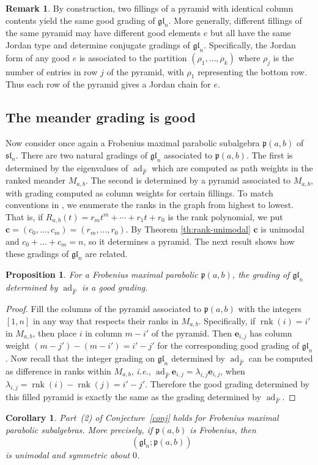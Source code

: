 \documentclass{amsart}
\def\bc{\mathbf{c}}
\def\be{\mathbf{e}}
\def\fp{\mathfrak p} %
\def\sl{\mathfrak{sl}}
\def\gl{\mathfrak{gl}}
\def\hatF{\widehat{F}}
\newcommand{\pab}[1][a,b]{\fp(#1)}
\def\sln{\sl_n}
\def\gln{\gl_n}
\newcommand{\Rfull}[1]{R_{#1}}
\def\dimvec{\mathop{\underline{\mathrm{dim}}}}
\def\ad{\operatorname{ad}}
\def\rnk{\operatorname{rnk}}
\newtheorem{corollary}[theorem]{Corollary}
\newtheorem{proposition}[theorem]{Proposition}
\theoremstyle{definition}
\newtheorem{remark}[theorem]{Remark}
\begin{document}
\begin{remark}\label{rem:identical-or-conjugate} 
By construction, two fillings of a pyramid with identical column contents yield the same good grading of $\gln$. More generally, different fillings of the same pyramid may have different good elements $e$ but all have the same Jordan type and determine conjugate gradings of $\gln$. Specifically, the Jordan form of any good $e$ is associated to the partition $(\rho_1, \ldots, \rho_k)$ where $\rho_j$ is the number of entries in row $j$ of the pyramid, with $\rho_1$ representing the bottom row. Thus each row of the pyramid gives a Jordan chain for $e$. 
\end{remark}

\subsection{The meander grading is good}
Now consider once again a Frobenius maximal parabolic subalgebra $\pab$ of $\sln$. There are two natural gradings of $\gln$ associated to $\pab$. The first is determined by the eigenvalues of $\ad_{\hatF}$ which are computed as path weights in the ranked meander $M_{a,b}$. The second is determined by a pyramid associated to $M_{a,b}$, with grading computed as column weights for certain fillings. To match conventions in \cite{elashvili2005classification}, we enumerate the ranks in the graph from highest to lowest. That is, if $\Rfull{a,b}(t)=r_mt^m+\cdots + r_1t + r_0$ is the rank polynomial, we put $\bc=(c_0,\ldots, c_m) = (r_m, \ldots, r_0)$. By Theorem \ref{th:rank-unimodal} $\bc$ is unimodal and $c_0+\ldots +c_m=n$, so it determines a pyramid. The next result shows how these gradings of $\gln$ are related.

\begin{proposition}
\label{th:meander-grading-good}
For a Frobenius maximal parabolic $\pab$, the grading of $\gln$
determined by $\ad_{\widehat F}$ is a good grading.
\end{proposition}
\begin{proof}
 Fill the columns of the pyramid associated to $\pab$ with the integers $[1,n]$ in any way that respects their ranks in $M_{a,b}$. Specifically, if $\rnk(i)=i'$ in $M_{a,b}$, then place $i$ in column $m-i'$ of the pyramid. Then $\be_{i,j}$ has column weight $(m-j')-(m-i') = i'-j'$ for the corresponding good grading of $\gln$. Now recall that the integer grading on $\gln$ determined by $\ad_{\hatF}$ can be computed as difference in ranks within $M_{a,b}$, {\it i.e.}, $\ad_{\hatF}\be_{i,j}=\lambda_{i,j}\be_{i,j}$, when $\lambda_{i,j} = \rnk(i)-\rnk(j) = i'-j'$. Therefore the good grading determined by this filled pyramid is exactly the same as the grading determined by $\ad_{\hatF}$.
\end{proof}
\begin{corollary}
\label{cor:conjecture-part2-maximal}
Part~{\rm (2)} of Conjecture~\ref{conj} holds for Frobenius maximal
parabolic subalgebras. More precisely, if $\pab$ is Frobenius, then
\[
\dimvec(\gln;\pab)
\]
is unimodal and symmetric about $0$.
\end{corollary}
\end{document}
